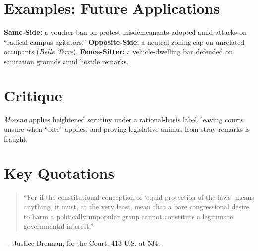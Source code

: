 \documentclass[12pt]{article}
\begin{document}
\section{Examples: Future Applications}
\textbf{Same-Side:} a voucher ban on protest misdemeanants adopted amid attacks on ``radical campus agitators.'' \textbf{Opposite-Side:} a neutral zoning cap on unrelated occupants (\textit{Belle Terre}). \textbf{Fence-Sitter:} a vehicle-dwelling ban defended on sanitation grounds amid hostile remarks.

\section{Critique}
\textit{Moreno} applies heightened scrutiny under a rational-basis label, leaving courts unsure when ``bite'' applies, and proving legislative animus from stray remarks is fraught.

\section{Key Quotations}
\begin{quote}
``For if the constitutional conception of `equal protection of the laws' means anything, it must, at the very least, mean that a bare congressional desire to harm a politically unpopular group cannot constitute a legitimate governmental interest.''
\end{quote}
\noindent --- Justice Brennan, for the Court, 413 U.S. at 534.
\end{document}
